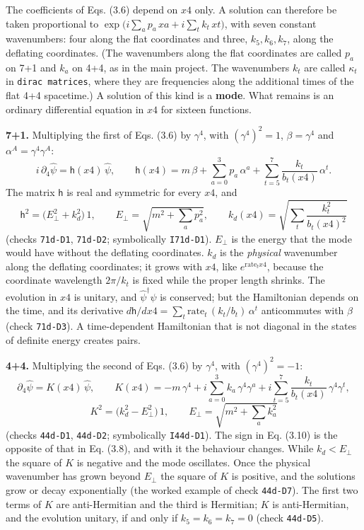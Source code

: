 \documentclass[
  10pt,
]{article}
\begin{document}
The coefficients of Eqs. (3.6) depend on \(x4\) only. A solution can
therefore be taken proportional to
\(\exp\big(i\sum_ap_a\,xa+i\sum_tk_t\,xt\big)\), with seven constant
wavenumbers: four along the flat coordinates and three, \(k_5,k_6,k_7\),
along the deflating coordinates. (The wavenumbers along the flat
coordinates are called \(p_a\) on 7+1 and \(k_a\) on 4+4, as in the main
project. The wavenumbers \(k_t\) are called \(\kappa_t\) in
\texttt{dirac\ matrices}, where they are frequencies along the
additional times of the flat 4+4 spacetime.) A solution of this kind is
a \textbf{mode}. What remains is an ordinary differential equation in
\(x4\) for sixteen functions.

\textbf{7+1.} Multiplying the first of Eqs. (3.6) by \(\gamma^4\), with
\((\gamma^4)^2=1\), \(\beta=\gamma^4\) and
\(\alpha^A=\gamma^4\gamma^A\):
\[i\,\partial_4\hat\psi=\mathsf h(x4)\,\hat\psi,\qquad
\mathsf h(x4)=m\,\beta+\sum_{a=0}^3p_a\,\alpha^a+\sum_{t=5}^7\frac{k_t}{b_t(x4)}\,\alpha^t .\tag{3.7}\]
The matrix \(\mathsf h\) is real and symmetric for every \(x4\), and
\[\mathsf h^2=\big(E_\perp^2+k_d^2\big)\,1,\qquad
E_\perp=\sqrt{m^2+\textstyle\sum_ap_a^2},\qquad
k_d(x4)=\sqrt{\sum_t\frac{k_t^2}{b_t(x4)^2}}\tag{3.8}\] (checks
\texttt{71d-D1}, \texttt{71d-D2}; symbolically \texttt{I71d-D1}).
\(E_\perp\) is the energy that the mode would have without the deflating
coordinates. \(k_d\) is the \emph{physical} wavenumber along the
deflating coordinates; it grows with \(x4\), like
\(e^{\mathrm{rate}_t x4}\), because the coordinate wavelength
\(2\pi/k_t\) is fixed while the proper length shrinks. The evolution in
\(x4\) is unitary, and \(\hat\psi^\dagger\hat\psi\) is conserved; but
the Hamiltonian depends on the time, and its derivative
\(d\mathsf h/dx4=\sum_t\mathrm{rate}_t\,(k_t/b_t)\,\alpha^t\)
anticommutes with \(\beta\) (check \texttt{71d-D3}). A time-dependent
Hamiltonian that is not diagonal in the states of definite energy
creates pairs.

\textbf{4+4.} Multiplying the second of Eqs. (3.6) by \(\gamma^4\), with
\((\gamma^4)^2=-1\): \[\partial_4\hat\psi=K(x4)\,\hat\psi,\qquad
K(x4)=-m\,\gamma^4+i\sum_{a=0}^3k_a\,\gamma^4\gamma^a+i\sum_{t=5}^7\frac{k_t}{b_t(x4)}\,\gamma^4\gamma^t,\tag{3.9}\]
\[K^2=\big(k_d^2-E_\perp^2\big)\,1,\qquad E_\perp=\sqrt{m^2+\textstyle\sum_ak_a^2}\tag{3.10}\]
(checks \texttt{44d-D1}, \texttt{44d-D2}; symbolically
\texttt{I44d-D1}). The sign in Eq. (3.10) is the opposite of that in Eq.
(3.8), and with it the behaviour changes. While \(k_d<E_\perp\) the
square of \(K\) is negative and the mode oscillates. Once the physical
wavenumber has grown beyond \(E_\perp\) the square of \(K\) is positive,
and the solutions grow or decay exponentially (the worked example of
check \texttt{44d-D7}). The first two terms of \(K\) are anti-Hermitian
and the third is Hermitian; \(K\) is anti-Hermitian, and the evolution
unitary, if and only if \(k_5=k_6=k_7=0\) (check \texttt{44d-D5}).
\end{document}
